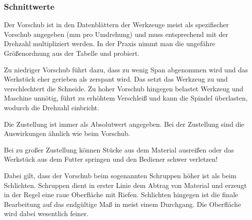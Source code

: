 \documentclass{\basedir/fablab-document}
\begin{document}
\subsubsection{Schnittwerte}
\label{Schnittwerte}
Der Vorschub ist in den Datenblättern der Werkzeuge meist als spezifischer Vorschub angegeben (mm pro Umdrehung) und muss entsprechend mit der Drehzahl multipliziert werden.
In der Praxis nimmt man die ungefähre Größenordnung aus der Tabelle und probiert.

Zu niedriger Vorschub führt dazu, dass zu wenig Span abgenommen wird und das Werkstück eher gerieben als zerspant wird.
Das setzt das Werkzeug zu und verschlechtert die Schneide.
Zu hoher Vorschub hingegen belastet Werkzeug und Maschine unnötig,
führt zu erhöhtem Verschleiß und kann die Spindel überlasten, wodurch die Drehzahl einbricht.

Die Zustellung ist immer als Absolutwert angegeben.
Bei der Zustellung sind die Auswirkungen ähnlich wie beim Vorschub.

Bei zu großer Zustellung können Stücke aus dem Material ausreißen oder das Werkstück aus dem Futter
springen und den Bediener schwer verletzen!

Dabei gilt, dass der Vorschub beim sogenannten Schruppen höher ist als beim Schlichten.
Schruppen dient in erster Linie dem Abtrag von Material und erzeugt in der Regel eine raue Oberfläche mit Riefen.
Schlichten hingegen ist die finale Bearbeitung auf das endgültige Maß in meist einem Durchgang.
Die Oberfläche wird dabei wesentlich feiner. 
\end{document}
